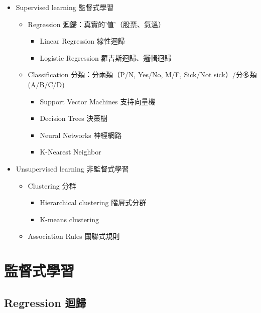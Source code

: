 \documentclass[]{book}
\providecommand{\tightlist}{%
  \setlength{\itemsep}{0pt}\setlength{\parskip}{0pt}}
\begin{document}
\begin{itemize}
\tightlist
\item
  Supervised learning 監督式學習

  \begin{itemize}
  \tightlist
  \item
    Regression 迴歸：真實的'值'（股票、氣溫）

    \begin{itemize}
    \tightlist
    \item
      Linear Regression 線性迴歸
    \item
      Logistic Regression 羅吉斯迴歸、邏輯迴歸
    \end{itemize}
  \item
    Classification 分類：分兩類（P/N, Yes/No, M/F, Sick/Not
    sick）/分多類 (A/B/C/D)

    \begin{itemize}
    \tightlist
    \item
      Support Vector Machines 支持向量機
    \item
      Decision Trees 決策樹
    \item
      Neural Networks 神經網路
    \item
      K-Nearest Neighbor
    \end{itemize}
  \end{itemize}
\item
  Unsupervised learning 非監督式學習

  \begin{itemize}
  \tightlist
  \item
    Clustering 分群

    \begin{itemize}
    \tightlist
    \item
      Hierarchical clustering 階層式分群
    \item
      K-means clustering
    \end{itemize}
  \item
    Association Rules 關聯式規則
  \end{itemize}
\end{itemize}

\section{監督式學習}

\subsection{Regression 迴歸}\label{regression-}
\end{document}

